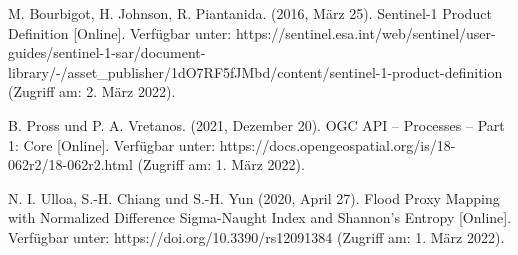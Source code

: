 \newpage
\thispagestyle{empty}
\begin{thebibliography}{1}
M. Bourbigot, H. Johnson, R. Piantanida. (2016, März 25). Sentinel-1 Product Definition [Online]. Verfügbar unter: 
https://sentinel.esa.int/web/sentinel/user-guides/sentinel-1-sar/document-library/-/asset\_publisher/1dO7RF5fJMbd/content/sentinel-1-product-definition 
(Zugriff am: 2. März 2022).

B. Pross und P. A. Vretanos. (2021, Dezember 20). OGC API – Processes – Part 1: Core [Online]. Verfügbar unter: 
https://docs.opengeospatial.org/is/18-062r2/18-062r2.html 
(Zugriff am: 1. März 2022).

N. I. Ulloa, S.-H. Chiang und S.-H. Yun (2020, April 27). Flood Proxy Mapping with Normalized Difference Sigma-Naught Index and Shannon’s Entropy [Online]. Verfügbar unter: 
https://doi.org/10.3390/rs12091384 
(Zugriff am: 1. März 2022).

\end{thebibliography}